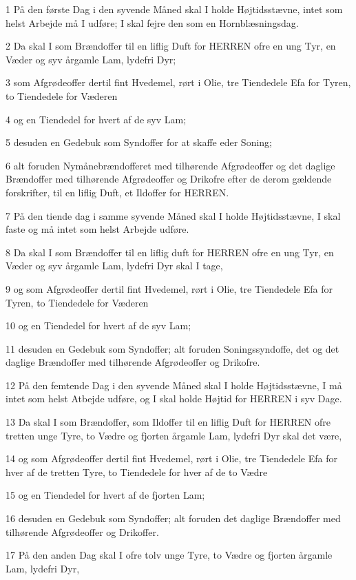 \par 1 På den første Dag i den syvende Måned skal I holde Højtidsstævne, intet som helst Arbejde må I udføre; I skal fejre den som en Hornblæsningsdag.
\par 2 Da skal I som Brændoffer til en liflig Duft for HERREN ofre en ung Tyr, en Væder og syv årgamle Lam, lydefri Dyr;
\par 3 som Afgrødeoffer dertil fint Hvedemel, rørt i Olie, tre Tiendedele Efa for Tyren, to Tiendedele for Væderen
\par 4 og en Tiendedel for hvert af de syv Lam;
\par 5 desuden en Gedebuk som Syndoffer for at skaffe eder Soning;
\par 6 alt foruden Nymånebrændofferet med tilhørende Afgrødeoffer og det daglige Brændoffer med tilhørende Afgrødeoffer og Drikofre efter de derom gældende forskrifter, til en liflig Duft, et Ildoffer for HERREN.
\par 7 På den tiende dag i samme syvende Måned skal I holde Højtidsstævne, I skal faste og må intet som helst Arbejde udføre.
\par 8 Da skal I som Brændoffer til en liflig duft for HERREN ofre en ung Tyr, en Væder og syv årgamle Lam, lydefri Dyr skal I tage,
\par 9 og som Afgrødeoffer dertil fint Hvedemel, rørt i Olie, tre Tiendedele Efa for Tyren, to Tiendedele for Væderen
\par 10 og en Tiendedel for hvert af de syv Lam;
\par 11 desuden en Gedebuk som Syndoffer; alt foruden Soningssyndoffe, det og det daglige Brændoffer med tilhørende Afgrødeoffer og Drikofre.
\par 12 På den femtende Dag i den syvende Måned skal I holde Højtidsstævne, I må intet som helst Atbejde udføre, og I skal holde Højtid for HERREN i syv Dage.
\par 13 Da skal I som Brændoffer, som Ildoffer til en liflig Duft for HERREN ofre tretten unge Tyre, to Vædre og fjorten årgamle Lam, lydefri Dyr skal det være,
\par 14 og som Afgrødeoffer dertil fint Hvedemel, rørt i Olie, tre Tiendedele Efa for hver af de tretten Tyre, to Tiendedele for hver af de to Vædre
\par 15 og en Tiendedel for hvert af de fjorten Lam;
\par 16 desuden en Gedebuk som Syndoffer; alt foruden det daglige Brændoffer med tilhørende Afgrødeoffer og Drikoffer.
\par 17 På den anden Dag skal I ofre tolv unge Tyre, to Vædre og fjorten årgamle Lam, lydefri Dyr,
